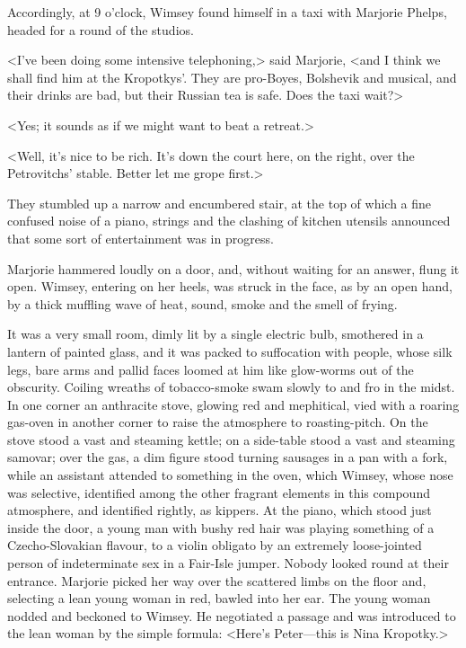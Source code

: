Accordingly, at 9 o'clock, Wimsey found himself in a taxi with Marjorie Phelps, headed for a round of the studios.

<I've been doing some intensive telephoning,> said Marjorie, <and I think we shall find him at the Kropotkys'. They are pro-Boyes, Bolshevik and musical, and their drinks are bad, but their Russian tea is safe. Does the taxi wait?>

<Yes; it sounds as if we might want to beat a retreat.>

<Well, it's nice to be rich. It's down the court here, on the right, over the Petrovitchs' stable. Better let me grope first.>

They stumbled up a narrow and encumbered stair, at the top of which a fine confused noise of a piano, strings and the clashing of kitchen utensils announced that some sort of entertainment was in progress.

Marjorie hammered loudly on a door, and, without waiting for an answer, flung it open. Wimsey, entering on her heels, was struck in the face, as by an open hand, by a thick muffling wave of heat, sound, smoke and the smell of frying.

It was a very small room, dimly lit by a single electric bulb, smothered in a lantern of painted glass, and it was packed to suffocation with people, whose silk legs, bare arms and pallid faces loomed at him like glow-worms out of the obscurity. Coiling wreaths of tobacco-smoke swam slowly to and fro in the midst. In one corner an anthracite stove, glowing red and mephitical, vied with a roaring gas-oven in another corner to raise the atmosphere to roasting-pitch. On the stove stood a vast and steaming kettle; on a side-table stood a vast and steaming samovar; over the gas, a dim figure stood turning sausages in a pan with a fork, while an assistant attended to something in the oven, which Wimsey, whose nose was selective, identified among the other fragrant elements in this compound atmosphere, and identified rightly, as kippers. At the piano, which stood just inside the door, a young man with bushy red hair was playing something of a Czecho-Slovakian flavour, to a violin obligato by an extremely loose-jointed person of indeterminate sex in a Fair-Isle jumper. Nobody looked round at their entrance. Marjorie picked her way over the scattered limbs on the floor and, selecting a lean young woman in red, bawled into her ear. The young woman nodded and beckoned to Wimsey. He negotiated a passage and was introduced to the lean woman by the simple formula: <Here's Peter—this is Nina Kropotky.>

